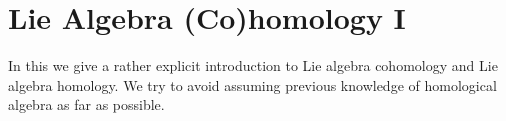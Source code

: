 \chapter{Lie Algebra (Co)homology I}
\label{lie algebra cohomology}


\begin{fluff}
	In this  we give a rather explicit introduction to Lie algebra cohomology and Lie algebra homology.
	We try to avoid assuming previous knowledge of homological algebra as far as possible.
\end{fluff}










